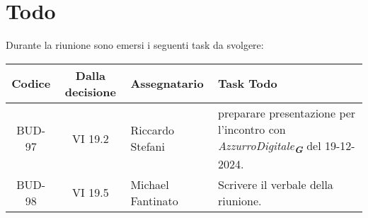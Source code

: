
\section{Todo}

Durante la riunione sono emersi i seguenti task da svolgere:

\vspace{0.5cm}

\begin{table}[htbp]
\centering
{}
\begin{tabular}{|c|c|p{}|p{}|}
    \hline
    \rowcolor[gray]{0.75}
    \textbf{Codice} & \textbf{Dalla decisione} & \textbf{Assegnatario} & \textbf{Task Todo} \\
    \hline
    BUD-97 & VI 19.2 & Riccardo Stefani & preparare presentazione per l'incontro con \emph{AzzurroDigitale}\textsubscript{\textit{\textbf{G}}} del 19-12-2024. \\
    \hline
    BUD-98 & VI 19.5 & Michael Fantinato & Scrivere il verbale della riunione. \\
\end{tabular}
\end{table}